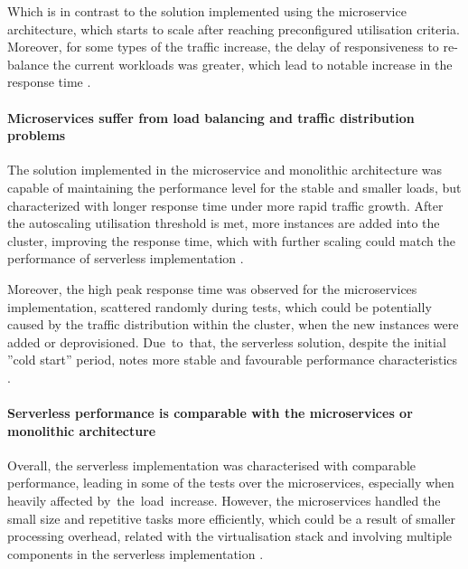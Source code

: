Which is in contrast to the solution implemented using the microservice architecture, which starts to scale after reaching preconfigured utilisation criteria.
Moreover, for some types of the traffic increase, the delay of responsiveness to re-balance the current workloads was greater, which lead to notable increase in the response time \cite{MicroservicesvsServerlessAPerformanceComparisonOnCloudNativeWebApplication}.

\paragraph{Microservices suffer from load balancing and traffic distribution problems}

The solution implemented in the microservice and monolithic architecture was capable of maintaining the performance level for the stable and smaller loads, but characterized with longer response time under more rapid traffic growth. After the autoscaling utilisation threshold is met, more instances are added into the cluster, improving the response time, which with further scaling could match the performance of serverless implementation \cite{ServerlessComputingAnInvestigationOfDeploymentEnvironmentsForWebAPIs}.

Moreover, the high peak response time was observed for the microservices implementation, scattered randomly during tests, which could be potentially caused by the traffic distribution within the cluster, when the new instances were added or deprovisioned. Due~to~that, the serverless solution, despite the initial ''cold start'' period, notes more stable and favourable performance characteristics \cite{MicroservicesvsServerlessAPerformanceComparisonOnCloudNativeWebApplication}.

\paragraph{Serverless performance is comparable with the microservices or monolithic architecture}

Overall, the serverless implementation was characterised with comparable performance, leading in some of the tests over the microservices, especially when heavily affected by~the~load~increase.
However, the microservices handled the small size and repetitive tasks more efficiently, which could be a result of smaller processing overhead, related with the virtualisation stack and involving multiple components in the serverless implementation \cite{MicroservicesvsServerlessAPerformanceComparisonOnCloudNativeWebApplication}.

